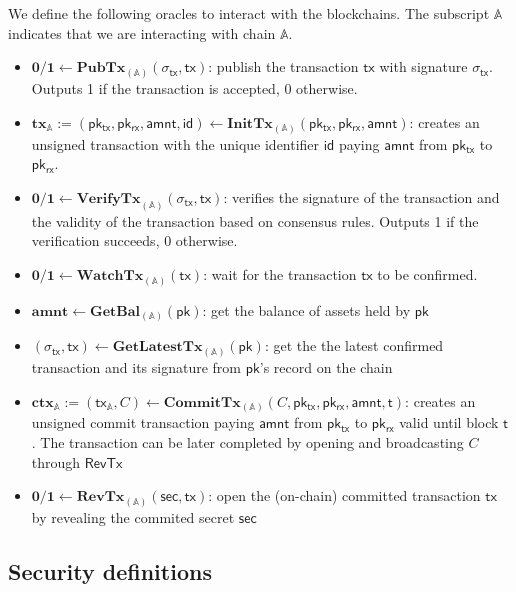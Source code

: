 \documentclass{article}      	%
\begin{document}
We define the following oracles to interact with the blockchains. The subscript $\mathbb{A}$ indicates that we are interacting with chain $\mathbb{A}$.

\begin{itemize}[topsep=0pt, itemsep=0pt, leftmargin=2em]
    \item $\mathbf{0/1} \gets \mathbf{PubTx}_{(\mathbb{A})}(\sigma_{\mathsf{tx}}, \mathsf{tx})$: publish the transaction $\mathsf{tx}$ with signature $\sigma_{\mathsf{tx}}$. Outputs 1 if the transaction is accepted, 0 otherwise.
    \item $\mathbf{tx}_{\mathbb{A}} := (\mathsf{pk_{tx}}, \mathsf{pk_{rx}}, \mathsf{amnt}, \mathsf{id})  \gets \mathbf{InitTx}_{(\mathbb{A})}(\mathsf{pk_{tx}}, \mathsf{pk_{rx}}, \mathsf{amnt})$: creates an unsigned transaction with the unique identifier $\mathsf{id}$ paying $\mathsf{amnt}$ from $\mathsf{pk_{tx}}$ to $\mathsf{pk_{rx}}$.
    \item $\mathbf{0/1} \gets \mathbf{VerifyTx}_{(\mathbb{A})}(\sigma_{\mathsf{tx}}, \mathsf{tx})$: verifies the signature of the transaction and the validity of the transaction based on consensus rules. Outputs 1 if the verification succeeds, 0 otherwise.
    \item $\mathbf{0/1} \gets \mathbf{WatchTx}_{(\mathbb{A})}(\mathsf{tx})$: wait for the transaction $\mathsf{tx}$ to be confirmed.
    \item $\mathbf{amnt} \gets \mathbf{GetBal}_{(\mathbb{A})}(\mathsf{pk})$: get the balance of assets held by $\mathsf{pk}$
    \item $(\sigma_{\mathsf{tx}}, \mathsf{tx}) \gets \mathbf{GetLatestTx}_{(\mathbb{A})}(\mathsf{pk})$: get the the latest confirmed transaction and its signature from $\mathsf{pk}$'s record on the chain
    \item $\mathbf{ctx}_{\mathbb{A}} := (\mathsf{tx_{\mathbb{A}}}, C) \gets \mathbf{CommitTx}_{(\mathbb{A})}(C, \mathsf{pk_{tx}}, \mathsf{pk_{rx}}, \mathsf{amnt}, \mathsf{t})$: creates an unsigned commit transaction paying $\mathsf{amnt}$ from $\mathsf{pk_{tx}}$ to $\mathsf{pk_{rx}}$ valid until block $\mathsf{t}$. The transaction can be later completed by opening and broadcasting $C$ through $\mathsf{RevTx}$
    \item $ \mathbf{0/1} \gets \mathbf{RevTx}_{(\mathbb{A})}(\mathsf{sec}, \mathsf{tx})$: open the (on-chain) committed transaction $\mathsf{tx}$ by revealing the commited secret $\mathsf{sec}$
\end{itemize}

\subsection{Security definitions}
\end{document}
